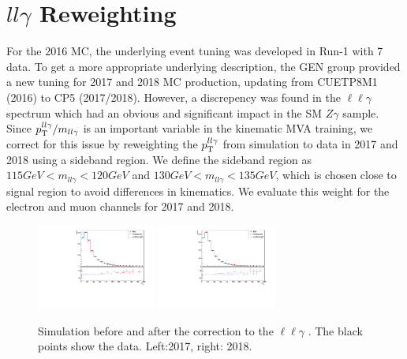 \section{$ll\gamma$ \pt Reweighting}\label{sec:Zpt}
For the 2016 MC, the underlying event tuning was developed in Run-1 with 7 \TeV data. 
To get a more appropriate underlying description, the GEN group provided a new tuning
for 2017 and 2018 MC production, updating from CUETP8M1 (2016) to CP5 (2017/2018).
However, a discrepency was found in the $\ell\ell\gamma$ \pt spectrum
which had an obvious and significant impact in the SM $Z\gamma$ sample. 
Since $p_{\mathrm{T}}^{ll\gamma}/m_{ll\gamma}$ is an important variable in the kinematic MVA training, 
we correct for this issue by reweighting the $p_{\mathrm{T}}^{ll\gamma}$ from simulation to data in 
2017 and 2018 using a sideband region. 
We define the sideband region as $115GeV<m_{ll\gamma}<120GeV$ and $130GeV<m_{ll\gamma}<135GeV$,
which is chosen close to signal region to avoid differences in kinematics.
We evaluate this weight for the electron and muon channels for 2017 and 2018.
\begin{figure}[htbp]
	\begin{center}
		\includegraphics[width=0.35\textwidth]{fig/zpt_reweight/zgptrewei_datasb17.pdf}
		\includegraphics[width=0.35\textwidth]{fig/zpt_reweight/zgptrewei_datasb18.pdf}
	\end{center}
	\caption{Simulation before and after the correction to the $\ell\ell\gamma$ \pt.
    The black points show the data. Left:2017, right: 2018.}
\end{figure}

